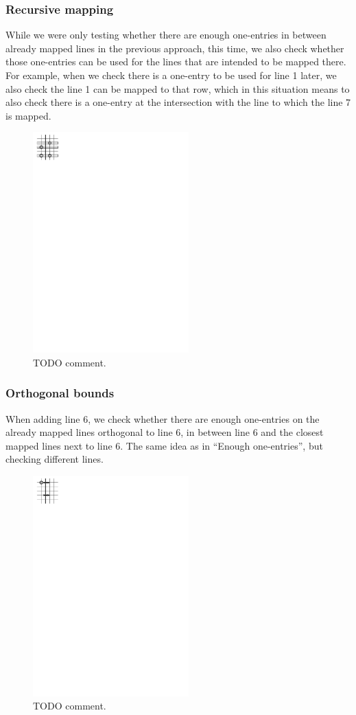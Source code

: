 \subsubsection{Recursive mapping}
While we were only testing whether there are enough one-entries in between already mapped lines in the previous approach, this time, we also check whether those one-entries can be used for the lines that are intended to be mapped there. For example, when we check there is a one-entry to be used for line 1 later, we also check the line 1 can be mapped to that row, which in this situation means to also check there is a one-entry at the intersection with the line to which the line 7 is mapped.
\begin{figure}[h!]
\centering
\includegraphics[width=60mm]{../img/recursive.pdf}
\caption{TODO comment.}
\label{recursive}
\end{figure}
\subsubsection{Orthogonal bounds}
When adding line 6, we check whether there are enough one-entries on the already mapped lines orthogonal to line 6, in between line 6 and the closest mapped lines next to line 6. The same idea as in ``Enough one-entries'', but checking different lines.
\begin{figure}[h!]
\centering
\includegraphics[width=60mm]{../img/orthogonal.pdf}
\caption{TODO comment.}
\label{orthogonal}
\end{figure}
